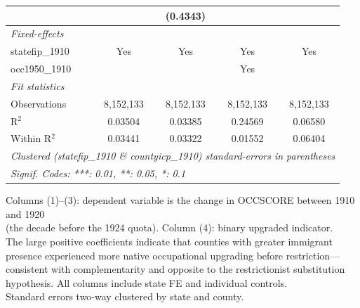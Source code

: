\begin{table}[htbp]
\begin{tabular}{lcccc}
                            &                               & (0.4343)                      &                          &   \\   
      \midrule
      \emph{Fixed-effects}\\
      statefip\_1910        & Yes                           & Yes                           & Yes                      & Yes\\  
      occ1950\_1910         &                               &                               & Yes                      & \\  
      \midrule
      \emph{Fit statistics}\\
      Observations          & 8,152,133                     & 8,152,133                     & 8,152,133                & 8,152,133\\  
      R$^2$                 & 0.03504                       & 0.03385                       & 0.24569                  & 0.06580\\  
      Within R$^2$          & 0.03441                       & 0.03322                       & 0.01552                  & 0.06404\\  
      \midrule \midrule
      \multicolumn{5}{l}{\emph{Clustered (statefip\_1910 \& countyicp\_1910) standard-errors in parentheses}}\\
      \multicolumn{5}{l}{\emph{Signif. Codes: ***: 0.01, **: 0.05, *: 0.1}}\\
   \end{tabular}
   
   \par \raggedright 
   Columns (1)--(3): dependent variable is the change in OCCSCORE between 1910 and 1920\\
   (the decade before the 1924 quota). Column (4): binary upgraded indicator.\\
   The large positive coefficients indicate that counties with greater immigrant\\
   presence experienced more native occupational upgrading before restriction---\\
   consistent with complementarity and opposite to the restrictionist substitution\\
   hypothesis. All columns include state FE and individual controls.\\
   Standard errors two-way clustered by state and county.
\end{table}


